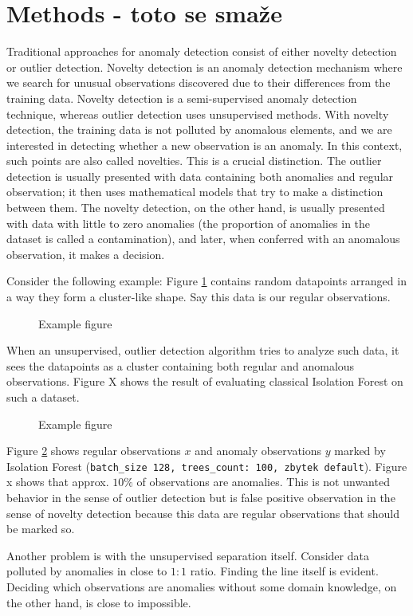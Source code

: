\section{Methods - toto se smaže}
\label{sec:methods}
Traditional approaches for anomaly detection consist of either novelty
detection or outlier detection. Novelty detection is an anomaly
detection mechanism where we search for unusual observations 
discovered due to their differences from the training data. Novelty
detection is a semi-supervised anomaly detection technique, whereas
outlier detection uses unsupervised methods. With novelty detection, the
training data is not polluted by anomalous elements, and we are
interested in detecting whether a new observation is an anomaly. In this context, such points are also called novelties. This is a crucial
distinction. The outlier detection is usually presented with data
containing both anomalies and regular observation; it then uses
mathematical models that try to make a distinction between them. The
novelty detection, on the other hand, is usually presented with data with
little to zero anomalies (the proportion of anomalies in the dataset is
called a contamination), and later, when conferred with an anomalous
observation, it makes a decision.

Consider the following example: Figure \ref{fig:example0} contains random datapoints
arranged in a way they form a cluster-like shape. Say this data is our
regular observations.

\begin{figure}[htbp]
\centering

\caption{Example figure}
\label{fig:example0}
\end{figure}

When an unsupervised, outlier detection algorithm tries to analyze such
data, it sees the datapoints as a cluster containing both regular and
anomalous observations. Figure X shows the result of evaluating
classical Isolation Forest on such a dataset.

\begin{figure}[htbp]
\centering

\caption{Example figure}
\label{fig:example05}
\end{figure}

Figure \ref{fig:example05} shows regular observations \(x\) and anomaly observations \(y\)
marked by Isolation Forest
(\texttt{batch\_size\ 128,\ trees\_count:\ 100,\ zbytek\ default}).
Figure x shows that approx. \(10\%\) of observations are anomalies. This
is not unwanted behavior in the sense of outlier detection but is false
positive observation in the sense of novelty detection because this
data are regular observations that should be marked so.

Another problem is with the unsupervised separation itself. Consider data polluted by anomalies in close to \(1:1\) ratio. Finding the line
itself is evident. Deciding which observations are anomalies without some domain knowledge, on the other hand, is close to impossible.